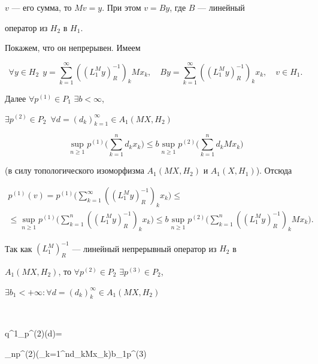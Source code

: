 $v$ --- его сумма, то $Mv=y$. При этом $v=By$, где $B$ --- линейный


оператор из $H_2$ в $H_1$.





Покажем, что он непрерывен. Имеем


$$


\forall y \in H_2\ \ 


y=\sum_{k=1}^{\infty}((L_1^M y)_R^{-1})_k Mx_k,\quad


By=\sum_{k=1}^{\infty}((L_1^M y)_R^{-1})_k x_k,\quad v\in H_1.


$$


Далее $\forall p^{(1)}\in P_1$ \; $\exists b<\infty$,


$\exists p^{(2)}\in P_2$ \,$\forall


d=(d_k)_{k=1}^{\infty}\in A_1(MX,H_2)$


$$


\sup\limits_{n\ge 1}p^{(1)}\bigg(\sum_{k=1}^{n}d_kx_k\bigg)\le


b\sup\limits_{n\ge 1}p^{(2)}\bigg(\sum_{k=1}^n d_kMx_k\bigg)


$$


(в силу топологического изоморфизма $A_1(MX,H_2)$ и $A_1(X,H_1)$). Отсюда


\begin{multline*}


p^{(1)}(v)=p^{(1)}\bigg(\sum_{k=1}^{\infty}((L_1^M y)_R^{-1})_k x_k\bigg)\le\\


%


\le\sup\limits_{n\ge 1}p^{(1)}\bigg(\sum_{k=1}^{n}((L_1^M y)_R^{-1})_kx_k\bigg)


\le b\sup\limits_{n\ge 1}p^{(2)}


\bigg(\sum_{k=1}^{n}((L_1^M y)_R^{-1})_k Mx_k\bigg).


\end{multline*}


Так как $(L_1^M)_R^{-1}$ --- линейный непрерывный оператор из $H_2$ в


$A_1(MX,H_2)$, то $\forall p^{(2)}\in P_2$ \; $\exists p^{(3)}\in P_2$,


$\exists b_1< +\infty: \forall d=(d_k)_k^{\infty}\in A_1(MX,H_2)$


$$


q^1_{p^{(2)}}(d)=


\sup\limits_{n}p^{(2)}\bigg(\sum_{k=1}^nd_kMx_k\bigg)\le b_1p^{(3)}


